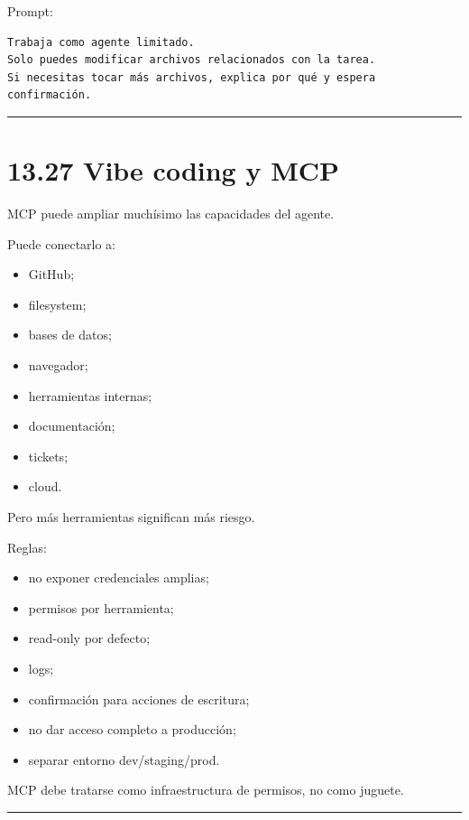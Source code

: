 Prompt:

\begin{lstlisting}
Trabaja como agente limitado.
Solo puedes modificar archivos relacionados con la tarea.
Si necesitas tocar más archivos, explica por qué y espera confirmación.
\end{lstlisting}

\begin{center}\rule{0.5\linewidth}{0.5pt}\end{center}

\section{13.27 Vibe coding y MCP}\label{vibe-coding-y-mcp}

MCP puede ampliar muchísimo las capacidades del agente.

Puede conectarlo a:

\begin{itemize}
\tightlist
\item
  GitHub;
\item
  filesystem;
\item
  bases de datos;
\item
  navegador;
\item
  herramientas internas;
\item
  documentación;
\item
  tickets;
\item
  cloud.
\end{itemize}

Pero más herramientas significan más riesgo.

Reglas:

\begin{itemize}
\tightlist
\item
  no exponer credenciales amplias;
\item
  permisos por herramienta;
\item
  read-only por defecto;
\item
  logs;
\item
  confirmación para acciones de escritura;
\item
  no dar acceso completo a producción;
\item
  separar entorno dev/staging/prod.
\end{itemize}

MCP debe tratarse como infraestructura de permisos, no como juguete.

\begin{center}\rule{0.5\linewidth}{0.5pt}\end{center}

